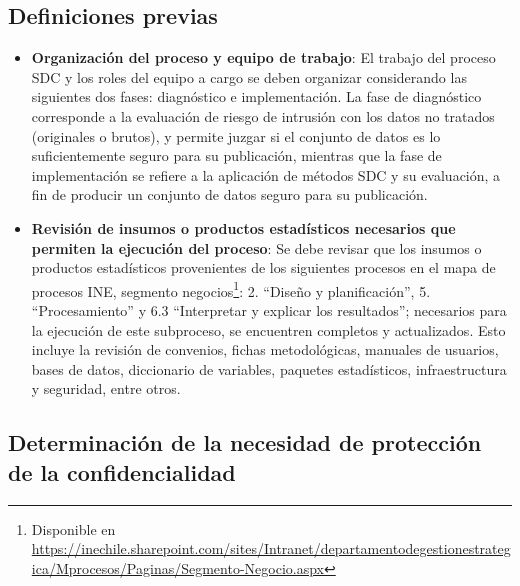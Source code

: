 \documentclass[
]{book}
\theoremstyle{definition}
\theoremstyle{definition}
\theoremstyle{definition}
\theoremstyle{definition}
\theoremstyle{remark}
\begin{document}
\hypertarget{definiciones-previas}{%
\subsection{Definiciones previas}\label{definiciones-previas}}

\begin{itemize}
\item
  \textbf{Organización del proceso y equipo de trabajo}: El trabajo del proceso SDC y los roles del equipo a cargo se deben organizar considerando las siguientes dos fases: diagnóstico e implementación. La fase de diagnóstico corresponde a la evaluación de riesgo de intrusión con los datos no tratados (originales o brutos), y permite juzgar si el conjunto de datos es lo suficientemente seguro para su publicación, mientras que la fase de implementación se refiere a la aplicación de métodos SDC y su evaluación, a fin de producir un conjunto de datos seguro para su publicación.
\item
  \textbf{Revisión de insumos o productos estadísticos necesarios que permiten la ejecución del proceso}: Se debe revisar que los insumos o productos estadísticos provenientes de los siguientes procesos en el mapa de procesos INE, segmento negocios\footnote{Disponible en \url{https://inechile.sharepoint.com/sites/Intranet/departamentodegestionestrategica/Mprocesos/Paginas/Segmento-Negocio.aspx}}: 2. ``Diseño y planificación'', 5. ``Procesamiento'' y 6.3 ``Interpretar y explicar los resultados''; necesarios para la ejecución de este subproceso, se encuentren completos y actualizados. Esto incluye la revisión de convenios, fichas metodológicas, manuales de usuarios, bases de datos, diccionario de variables, paquetes estadísticos, infraestructura y seguridad, entre otros.
\end{itemize}

\hypertarget{determinaciuxf3n-de-la-necesidad-de-protecciuxf3n-de-la-confidencialidad}{%
\subsection{Determinación de la necesidad de protección de la confidencialidad}\label{determinaciuxf3n-de-la-necesidad-de-protecciuxf3n-de-la-confidencialidad}}
\end{document}
